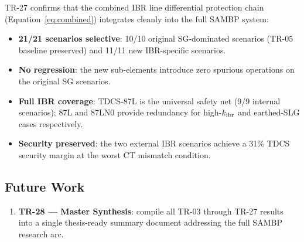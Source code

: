 \documentclass[11pt,a4paper]{article}
\begin{document}
TR-27 confirms that the combined IBR line differential protection chain
(Equation~\eqref{eq:combined}) integrates cleanly into the full SAMBP
system:

\begin{itemize}
  \item \textbf{21/21 scenarios selective}: 10/10 original SG-dominated
    scenarios (TR-05 baseline preserved) and 11/11 new IBR-specific scenarios.
  \item \textbf{No regression}: the new sub-elements introduce zero
    spurious operations on the original SG scenarios.
  \item \textbf{Full IBR coverage}: TDCS-87L is the universal safety net
    (9/9 internal scenarios); 87L and 87LN0 provide redundancy for
    high-$k_{\rm ibr}$ and earthed-SLG cases respectively.
  \item \textbf{Security preserved}: the two external IBR scenarios
    achieve a 31\% TDCS security margin at the worst CT mismatch condition.
\end{itemize}

\subsection{Future Work}

\begin{enumerate}
  \item \textbf{TR-28 — Master Synthesis}: compile all TR-03 through TR-27
    results into a single thesis-ready summary document addressing the full
    SAMBP research arc.
\end{enumerate}



\end{document}
